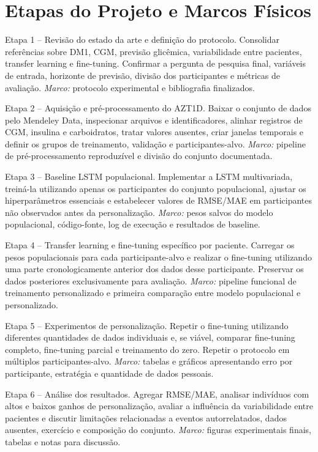 \documentclass[conference]{IEEEtran}
\begin{document}
\section{Etapas do Projeto e Marcos Físicos}
\label{sec:etapas}

Etapa 1 -- Revisão do estado da arte e definição do protocolo.
Consolidar referências sobre DM1, CGM, previsão glicêmica, variabilidade entre pacientes, transfer learning e fine-tuning. Confirmar a pergunta de pesquisa final, variáveis de entrada, horizonte de previsão, divisão dos participantes e métricas de avaliação.
\textit{Marco:} protocolo experimental e bibliografia finalizados.

Etapa 2 -- Aquisição e pré-processamento do AZT1D.
Baixar o conjunto de dados pelo Mendeley Data, inspecionar arquivos e identificadores, alinhar registros de CGM, insulina e carboidratos, tratar valores ausentes, criar janelas temporais e definir os grupos de treinamento, validação e participantes-alvo.
\textit{Marco:} pipeline de pré-processamento reproduzível e divisão do conjunto documentada.

Etapa 3 -- Baseline LSTM populacional.
Implementar a LSTM multivariada, treiná-la utilizando apenas os participantes do conjunto populacional, ajustar os hiperparâmetros essenciais e estabelecer valores de RMSE/MAE em participantes não observados antes da personalização.
\textit{Marco:} pesos salvos do modelo populacional, código-fonte, log de execução e resultados de baseline.

Etapa 4 -- Transfer learning e fine-tuning específico por paciente.
Carregar os pesos populacionais para cada participante-alvo e realizar o fine-tuning utilizando uma parte cronologicamente anterior dos dados desse participante. Preservar os dados posteriores exclusivamente para avaliação.
\textit{Marco:} pipeline funcional de treinamento personalizado e primeira comparação entre modelo populacional e personalizado.

Etapa 5 -- Experimentos de personalização.
Repetir o fine-tuning utilizando diferentes quantidades de dados individuais e, se viável, comparar fine-tuning completo, fine-tuning parcial e treinamento do zero. Repetir o protocolo em múltiplos participantes-alvo.
\textit{Marco:} tabelas e gráficos apresentando erro por participante, estratégia e quantidade de dados pessoais.

Etapa 6 -- Análise dos resultados.
Agregar RMSE/MAE, analisar indivíduos com altos e baixos ganhos de personalização, avaliar a influência da variabilidade entre pacientes e discutir limitações relacionadas a eventos autorrelatados, dados ausentes, exercício e composição do conjunto.
\textit{Marco:} figuras experimentais finais, tabelas e notas para discussão.
\end{document}
